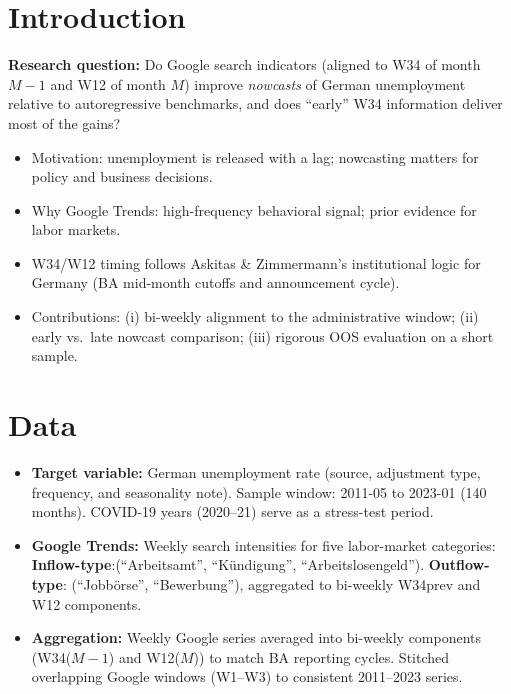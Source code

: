 \documentclass{article}
\begin{document}
\section{Introduction}
\textbf{Research question:} Do Google search indicators (aligned to W34 of month $M-1$ and W12 of month $M$) improve \emph{nowcasts} of German unemployment relative to autoregressive benchmarks, and does “early” W34 information deliver most of the gains?

\begin{itemize}
  \item Motivation: unemployment is released with a lag; nowcasting matters for policy and business decisions.
  \item Why Google Trends: high-frequency behavioral signal; prior evidence for labor markets.
  \item W34/W12 timing follows Askitas \& Zimmermann’s institutional logic for Germany (BA mid-month cutoffs and announcement cycle).
  \item Contributions: (i) bi-weekly alignment to the administrative window; (ii) early vs.\ late nowcast comparison; (iii) rigorous OOS evaluation on a short sample.
\end{itemize}



\section{Data}
\begin{itemize}
  \item \textbf{Target variable:} German unemployment rate (source, adjustment type, frequency, and seasonality note). Sample window: 2011-05 to 2023-01 (140 months). COVID-19 years (2020–21) serve as a stress-test period.
  \item \textbf{Google Trends:} 
  Weekly search intensities for five labor-market categories:
  \textbf{Inflow-type}:(“Arbeitsamt”, “Kündigung”, “Arbeitslosengeld”).
  \textbf{Outflow-type}: (“Jobbörse”, “Bewerbung”),
aggregated to bi-weekly W34prev and W12 components.  
  \item \textbf{Aggregation:} Weekly Google series averaged into bi-weekly components  (W34($M-1$) and W12($M$)) to match BA reporting cycles. Stitched overlapping Google windows (W1–W3) to consistent 2011–2023 series.
\end{itemize}
\end{document}
